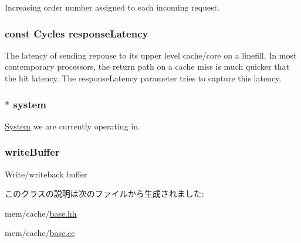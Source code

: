 \label{classBaseCache_ab26c49bd3bef351f3658df29505d78dd}
Increasing order number assigned to each incoming request. \hypertarget{classBaseCache_ab3672589b3ea30e547b2a30f50d814eb}{
\subsubsection[{responseLatency}]{\setlength{\rightskip}{0pt plus 5cm}const {\bf Cycles} {\bf responseLatency}}}
\label{classBaseCache_ab3672589b3ea30e547b2a30f50d814eb}
The latency of sending reponse to its upper level cache/core on a linefill. In most contemporary processors, the return path on a cache miss is much quicker that the hit latency. The responseLatency parameter tries to capture this latency. \hypertarget{classBaseCache_af27ccd765f13a4b7bd119dc7579e2746}{
\subsubsection[{system}]{$\ast$ {\bf system}}}
\label{classBaseCache_af27ccd765f13a4b7bd119dc7579e2746}
\hyperlink{classSystem}{System} we are currently operating in. \hypertarget{classBaseCache_ad44ec41bd8517224df8584b5e7fbe372}{
\subsubsection[{writeBuffer}]{ {\bf writeBuffer}}}
\label{classBaseCache_ad44ec41bd8517224df8584b5e7fbe372}
Write/writeback buffer 

このクラスの説明は次のファイルから生成されました:\begin{DoxyCompactItemize}
\item 
mem/cache/\hyperlink{mem_2cache_2base_8hh}{base.hh}\item 
mem/cache/\hyperlink{mem_2cache_2base_8cc}{base.cc}\end{DoxyCompactItemize}
